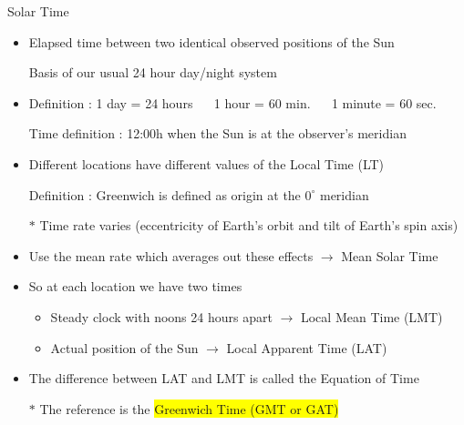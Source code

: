 \begin{center}
{\red Solar Time}
\end{center}
%
\begin{itemize}
\item {\blue Elapsed time between two identical observed positions of the Sun}
\item[] Basis of our usual 24 hour day/night system
\item Definition : 1 day = 24 hours $\quad$ 1 hour = 60 min. $\quad$ 1 minute = 60 sec.
\item[] Time definition : 12:00h when the Sun is at the observer's meridian
\item Different locations have different values of the {\blue Local Time (LT)}
\item[] Definition : {\blue Greenwich is defined as origin at the $0^{\circ}$ meridian}
\item[$\ast$] Time rate varies (eccentricity of Earth's orbit and tilt of Earth's spin axis)
\item Use the mean rate which averages out these effects $\rightarrow$ {\blue Mean Solar Time}
\item So at each location we have two times
\begin{itemize}
\item Steady clock with noons 24 hours apart $\rightarrow$ {\blue Local Mean Time (LMT)}
\item Actual position of the Sun $\rightarrow$ {\blue Local Apparent Time (LAT)}
\end{itemize}
\item The difference between LAT and LMT is called the {\blue Equation of Time}
\item[$\ast$] The reference is the \colorbox{yellow}{Greenwich Time (GMT or GAT)} 
\end{itemize}

